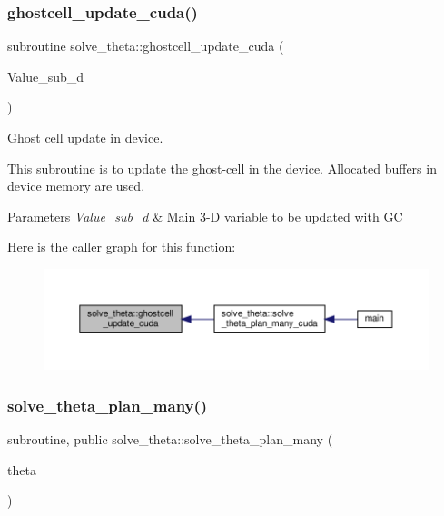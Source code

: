 \subsubsection{\texorpdfstring{ghostcell\+\_\+update\+\_\+cuda()}{ghostcell\_update\_cuda()}}
{\footnotesize\ttfamily subroutine solve\+\_\+theta\+::ghostcell\+\_\+update\+\_\+cuda (\begin{DoxyParamCaption}\item[{double precision}]{Value\+\_\+sub\+\_\+d }\end{DoxyParamCaption})}



Ghost cell update in device. 

This subroutine is to update the ghost-\/cell in the device. Allocated buffers in device memory are used. 
\begin{DoxyParams}{Parameters}
{\em Value\+\_\+sub\+\_\+d} & Main 3-\/D variable to be updated with GC \\
\hline
\end{DoxyParams}
Here is the caller graph for this function\+:
\nopagebreak
\begin{figure}[H]
\begin{center}
\leavevmode
\includegraphics[width=350pt]{namespacesolve__theta_a75284cf6dd015edde5309be8368c4c9e_icgraph}
\end{center}
\end{figure}
\mbox{\label{namespacesolve__theta_a0b7fdb576c007dc344092bf40efb0f4b}} 
\subsubsection{\texorpdfstring{solve\+\_\+theta\+\_\+plan\+\_\+many()}{solve\_theta\_plan\_many()}}
{\footnotesize\ttfamily subroutine, public solve\+\_\+theta\+::solve\+\_\+theta\+\_\+plan\+\_\+many (\begin{DoxyParamCaption}\item[{double precision, dimension(0\+:nx\+\_\+sub, 0\+:ny\+\_\+sub, 0\+:nz\+\_\+sub), intent(inout)}]{theta }\end{DoxyParamCaption})}



